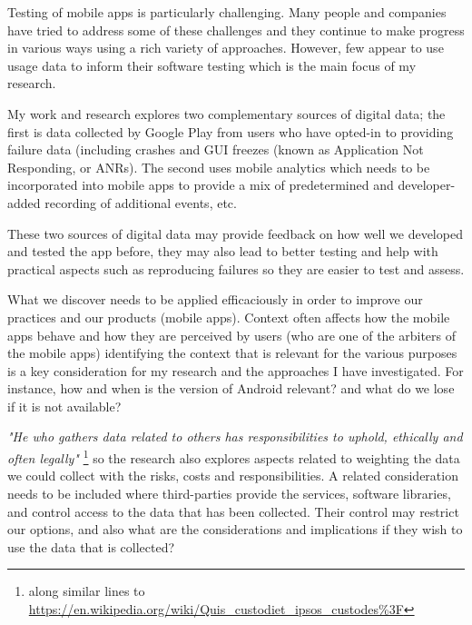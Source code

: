 Testing of mobile apps is particularly challenging. Many people and companies have tried to address some of these challenges and they continue to make progress in various ways using a rich variety of approaches. However, few appear to use usage data to inform their software testing which is the main focus of my research.

My work and research explores two complementary sources of digital data; the first is data collected by Google Play from users who have opted-in to providing failure data (including crashes and GUI freezes (known as Application Not Responding, or ANRs). The second uses mobile analytics which needs to be incorporated into mobile apps to provide a mix of predetermined and developer-added recording of additional events, etc.

These two sources of digital data may provide feedback on how well we developed and tested the app before, they may also lead to better testing and help with practical aspects such as reproducing failures so they are easier to test and assess.

What we discover needs to be applied efficaciously in order to improve our practices and our products (mobile apps). Context often affects how the mobile apps behave and how they are perceived by users (who are one of the arbiters of the mobile apps) identifying the context that is relevant for the various purposes is a key consideration for my research and the approaches I have investigated. For instance, how and when is the version of Android relevant? and what do we lose if it is not available? 

\textit{"He who gathers data related to others has responsibilities to uphold, ethically and often legally"} \footnote{along similar lines to \url{https://en.wikipedia.org/wiki/Quis\_custodiet\_ipsos\_custodes\%3F}}
so the research also explores aspects related to weighting the data we could collect with the risks, costs and responsibilities. A related consideration needs to be included where third-parties provide the services, software libraries, and control access to the data that has been collected. Their control may restrict our options, and also what are the considerations and implications if they wish to use the data that is collected?

